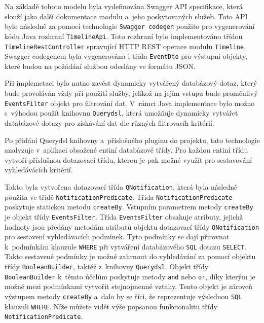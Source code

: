 \documentclass[twoside, 12pt]{article}
\begin{document}
{\clearpage

\obrazek
{}

\clearpage

Na základě tohoto modelu byla vydefinována Swagger API specifikace,
která slouží jako další dokumentace modulu a~jeho poskytovaných služeb.
Toto API bylo následně za pomocí technologie \texttt{Swagger codegen}
použito pro vygenerování kódu Java rozhraní \texttt{TimelineApi}.
Toto rozhraní bylo implementováno třídou \texttt{TimelineRestController}
spravující HTTP REST operace modulu \texttt{Timeline}.
Swagger codegenem byla vygenerována i třída \texttt{EventDto} pro výstupní objekty,
které budou na požádání službou odeslány ve formátu JSON.

Při implemetaci bylo nutno zavést dynamicky vytvářený databázový dotaz,
který bude provoláván vždy při použití služby,
jelikož na jejím vstupu bude proměnlivý \texttt{EventsFilter} objekt pro filtrování dat.
V~rámci Java implementace bylo možno s~výhodou použít knihovnu \texttt{Querydsl},
která umožňuje dynamicky vytvářet databázové dotazy
pro získávání dat dle různých filtrovacíh kritérií.

Po přidání Querydsl knihovny a~příslušného pluginu do projektu,
tato technologie analyzuje v~aplikaci obsažené entiní databázové třídy.
Pro každou entiní třídu vytvoří příslušnou dotazovací třídu,
kterou je pak možné využít pro sestavování vyhledávácích kritérií.

Takto byla vytvořena dotazovací třída \texttt{QNotification},
která byla následně použita ve třídě \texttt{NotificationPredicate}.
Třida \texttt{NotificationPredicate} poskytuje statickou metodu \texttt{createBy}.
Vstupním parametrem metody \texttt{createBy} je objekt třídy \texttt{EventsFilter}.
Třída \texttt{EventsFilter} obsahuje atributy, jejichž hodnoty jsou předány metodám atributů objektu
dotazovací třídy \texttt{QNotification} pro sestavení vyhledávacích podmínek.
Tyto podmínky se dají přirovnat k~podmínkám klauzule \texttt{WHERE}
při vytváření databázového \texttt{SQL} dotazu \texttt{SELECT}.
Takto sestavené podmínky je možné zahrnout do vyhledávání za pomocí objektu třídy \texttt{BooleanBuilder},
taktéž z~knihovny \texttt{Querydsl}.
Objekt třídy \texttt{BooleanBuilder} k~těmto účelům poskytuje metody \texttt{and} nebo \texttt{or},
díky kterým je možné mezi podmínkami vytvořit stejnojmenné vztahy.
Tento objekt je zároveň výstupem metody \texttt{createBy} a~dalo by se říci,
že reprezentuje výslednou \texttt{SQL} klauzuli \texttt{WHERE}.
Níže můžete vidět výše popsanou funkcionalitu třídy \texttt{NotificationPredicate}.

}
\end{document}
